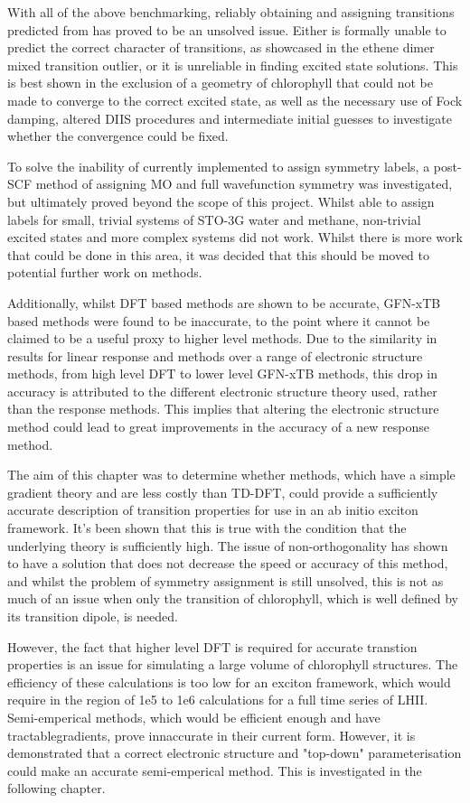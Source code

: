 With all of the above benchmarking, reliably obtaining and assigning transitions
predicted from \dscf has proved to be an unsolved issue. Either \dscf is formally
unable to predict the correct character of transitions, as showcased in the ethene 
dimer mixed transition outlier, or it is unreliable in finding excited state solutions.
This is best shown in the exclusion of a geometry of chlorophyll that could not
be made to converge to the correct excited state, as well as the necessary use of
Fock damping, altered DIIS procedures and intermediate initial guesses to investigate
whether the convergence could be fixed.

To solve the inability of currently implemented \dscf to assign symmetry labels,
a post-SCF method of assigning MO and full wavefunction symmetry was investigated,
but ultimately proved beyond the scope of this project. Whilst able to assign labels
for small, trivial systems of STO-3G water and methane, non-trivial excited states
and more complex systems did not work. Whilst there is more work that could be done
in this area, it was decided that this should be moved to potential further work
on \dscf methods.

Additionally, whilst DFT based \dscf methods are shown to be accurate, GFN-xTB based methods
were found to be inaccurate, to the point where it cannot be claimed to be a useful
proxy to higher level methods. Due to the similarity in results for linear response and
\dscf methods over a range of electronic structure methods, from high level DFT
to lower level GFN-xTB methods, this drop in accuracy is attributed to the different 
electronic structure theory used, rather than the response methods. This implies
that altering the electronic structure method could lead to great improvements
in the accuracy of a new response method.

The aim of this chapter was to determine whether \dscf methods, which have a simple
gradient theory and are less costly than TD-DFT, could provide a sufficiently accurate
description of transition properties for use in an ab initio exciton framework.
It's been shown that this is true with the condition that the underlying theory
is sufficiently high. The issue of non-orthogonality has shown to have a solution
that does not decrease the speed or accuracy of this method, and whilst the problem
of symmetry assignment is still unsolved, this is not as much of an issue when only
the \Qy transition of chlorophyll, which is well defined by its transition dipole, is 
needed.

However, the fact that higher level DFT is required for accurate transtion properties 
is an issue for simulating a large volume of chlorophyll structures. The efficiency
of these calculations is too low for an exciton framework, which would require in
the region of 1e5 to 1e6 calculations for a full time series of LHII. Semi-emperical
\dscf methods, which would be efficient enough and have tractablegradients, prove
innaccurate in their current form. However, it is demonstrated that a correct electronic
structure and "top-down" parameterisation could make an accurate semi-emperical
method. This is investigated in the following chapter.
